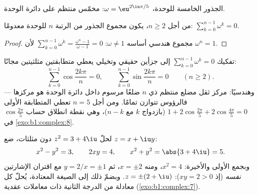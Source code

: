 \begin{omfigure}

{\small الجذور الخامسة للوحدة، $\omega = \eu^{2\iu\pi/5}$:
مخمّس منتظم على دائرة الوحدة.}
\end{omfigure}

\begin{proposition}\label{prop:b1:complex:sumroots}
من أجل $n \geq 2$، يكون مجموع الجذور من الرتبة $n$ للوحدة معدومًا:
$\sum_{k=0}^{n-1} \omega^k = 0$.
\end{proposition}

\begin{proof}
مجموع هندسي أساسه $\omega \neq 1$:
$\sum_{k=0}^{n-1} \omega^k = \frac{\omega^n - 1}{\omega - 1} = 0$
لأن $\omega^n = 1$.
\end{proof}

\begin{example}\label{ex:b1:complex:sumrootsparts}
تفكيك $\sum_{k=0}^{n-1}\omega^k = 0$ إلى جزأين حقيقي وتخيلي
يعطي متطابقتين مثلثيتين مجانًا:
\[
\sum_{k=0}^{n-1}\cos\frac{2k\pi}n = 0,
\qquad
\sum_{k=0}^{n-1}\sin\frac{2k\pi}n = 0
\qquad (n \geq 2).
\]
وهندسيًا: مركز ثقل مضلع منتظم ذي $n$ ضلعًا مرسوم داخل دائرة
الوحدة هو مركزها --- فالرؤوس تتوازن تمامًا.
ومن أجل $n = 5$ تعطي المتطابقة الأولى $1 + 2\cos\frac{2\pi}5 +
2\cos\frac{4\pi}5 = 0$ (بازدواج $k$ مع $n - k$)، وهي نقطة انطلاق
حساب $\cos\frac{2\pi}5$ في \cref{exo:b1:complex:8}.
\end{example}

\begin{example}\label{ex:b1:complex:sqrt}
لحلّ $z^2 = 3 + 4\iu$ دون مثلثات، ضع $z = x + \iu y$:
\[
x^2 - y^2 = 3, \qquad 2xy = 4, \qquad x^2 + y^2 = \abs{3 + 4\iu} = 5 .
\]
وبجمع الأولى والأخيرة: $x^2 = 4$، ومنه $x = \pm 2$، ثم $y = 2/x =
\pm 1$ مع اقتران الإشارتين \emph{نفسه} (إذ $xy = 2 > 0$): $z = \pm(2 +
\iu)$. وبضمّ ذلك إلى الصيغة المعتادة، يُحلّ كل معادلة من الدرجة
الثانية ذات معاملات عقدية
(\cref{exo:b1:complex:7}).
\end{example}

